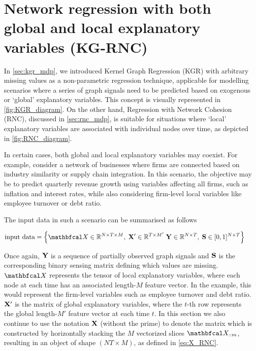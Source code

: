 


\section{Network regression with both global and local explanatory variables (KG-RNC)}

In \cref{sec:kgr_mdp}, we introduced Kernel Graph Regression (KGR) with arbitrary missing values as a non-parametric regression technique, applicable for modelling scenarios where a series of graph signals need to be predicted based on exogenous or `global' explanatory variables. This concept is visually represented in \cref{fig:KGR_diagram}. On the other hand, Regression with Network Cohesion (RNC), discussed in \cref{sec:rnc_mdp}, is suitable for situations where `local' explanatory variables are associated with individual nodes over time, as depicted in \cref{fig:RNC_diagram}.

In certain cases, both global and local explanatory variables may coexist. For example, consider a network of businesses where firms are connected based on industry similarity or supply chain integration. In this scenario, the objective may be to predict quarterly revenue growth using variables affecting all firms, such as inflation and interest rates, while also considering firm-level local variables like employee turnover or debt ratio.

The input data in such a scenario can be summarised as follows

\begin{align*}
    \text{input data} &= \left\{\Xt \in \R^{N \times T \times M}, \; \X' \in \R^{T \times M'}\; \Y \in \R^{N \times T}, \; \Ss \in [0, 1]^{N \times T} \right\}
\end{align*}

Once again, $\mathbf{Y}$ is a sequence of partially observed graph signals and $\mathbf{S}$ is the corresponding binary sensing matrix  defining which values are missing. $\Xt$ represents the tensor of local explanatory variables, where each node at each time has an associated length-$M$ feature vector. In the example, this would represent the firm-level variables such as employee turnover and debt ratio. $\mathbf{X}'$ is the matrix of global explanatory variables, where the $t$-th row represents the global length-$M'$ feature vector at each time $t$. In this section we also continue to use the notation $\mathbf{X}$ (without the prime) to denote the matrix which is constructed by horizontally stacking the $M$ vectorized slices $\Xt_{::m}$, resulting in an object of shape $(NT \times M)$, as defined in \cref{eq:X_RNC}. 


